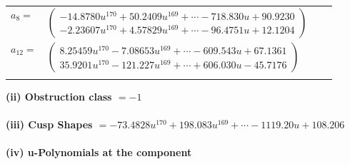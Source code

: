 \documentclass[1p]{elsarticle_modified}
\theoremstyle{definition}
\begin{document}
\begin{tabular}{m{7pt} m{180pt} m{7pt} m{180pt} }
\flushright $a_{8}=$&$\begin{pmatrix}-14.8780 u^{170}+50.2409 u^{169}+\cdots-718.830 u+90.9230\\-2.23607 u^{170}+4.57829 u^{169}+\cdots-96.4751 u+12.1204\end{pmatrix}$ \\
\flushright $a_{12}=$&$\begin{pmatrix}8.25459 u^{170}-7.08653 u^{169}+\cdots-609.543 u+67.1361\\35.9201 u^{170}-121.227 u^{169}+\cdots+606.030 u-45.7176\end{pmatrix}$\\&\end{tabular}
\flushleft \textbf{(ii) Obstruction class $= -1$}\\~\\
\flushleft \textbf{(iii) Cusp Shapes $= -73.4828 u^{170}+198.083 u^{169}+\cdots-1119.20 u+108.206$}\\~\\
\newpage\renewcommand{\arraystretch}{1}
\flushleft \textbf{(iv) u-Polynomials at the component}\newline \\
\end{document}
